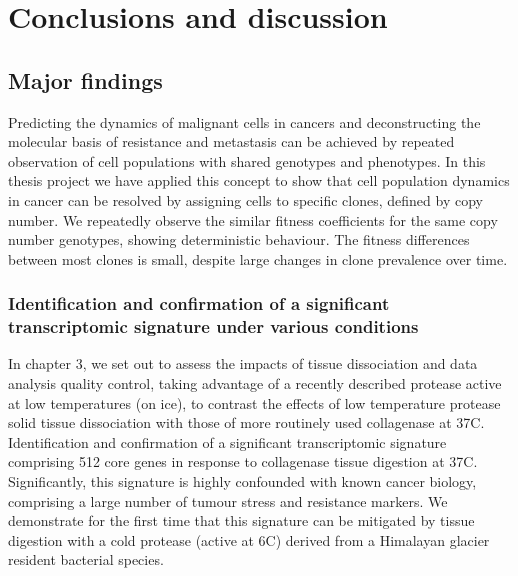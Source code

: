 
{\chapter{Conclusions and discussion}

}
\label{ch:Chapter6}

\section{Major findings}
Predicting the dynamics of malignant cells in cancers and deconstructing the molecular basis of resistance and metastasis can be achieved by repeated observation of cell populations with shared genotypes and phenotypes. In this thesis project we have applied this concept to show that cell population dynamics in cancer can be resolved by assigning cells to specific clones, defined by copy number. We repeatedly observe the similar fitness coefficients for the same copy number genotypes, showing deterministic behaviour. The fitness differences between most clones is small, despite large changes in clone prevalence over time.


\subsection{Identification and confirmation of a significant transcriptomic signature under various conditions}

In chapter 3, we set out to assess the impacts of tissue dissociation and data analysis quality control, taking advantage of a recently described protease active at low temperatures (on ice), to contrast the effects of low temperature protease solid tissue dissociation with those of more routinely used collagenase at 37\textdegree C. Identification and confirmation of a significant transcriptomic signature comprising 512 core genes in response to collagenase tissue digestion at 37\textdegree C. Significantly, this signature is highly confounded with known cancer biology, comprising a large number of tumour stress and resistance markers. We demonstrate for the first time that this signature can be mitigated by tissue digestion with a cold protease (active at 6\textdegree C) derived from a Himalayan glacier resident bacterial species.

